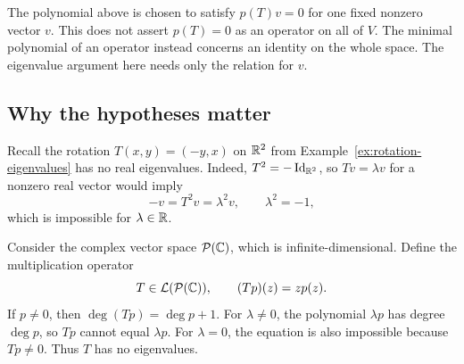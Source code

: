 \begin{remark}
  The polynomial above is chosen to satisfy $p(T)v=0$ for one fixed
  nonzero vector $v$. This does not assert $p(T)=0$ as an operator
  on all of $V$. The minimal polynomial of an operator instead
  concerns an identity on the whole space. The eigenvalue argument
  here needs only the relation for $v$.
\end{remark}

\subsection{Why the hypotheses matter}

\begin{example}
  Recall the rotation $T(x,y)=(-y,x)$ on $\mathbb{R}^2$ from
  Example~\ref{ex:rotation-eigenvalues} has no real eigenvalues.
  Indeed, $T^2=-\operatorname{Id}_{\mathbb{R}^2}$, so $Tv=\lambda v$
  for a nonzero real vector would imply
  \[
    -v=T^2v=\lambda^2v,\qquad\lambda^2=-1,
  \]
  which is impossible for $\lambda\in\mathbb{R}$.
\end{example}

\begin{example}
  Consider the complex vector space $\mathcal P(\mathbb{C})$, which
  is infinite-dimensional. Define the multiplication operator
  \[
    T\in\mathcal L(\mathcal P(\mathbb{C})),\qquad (Tp)(z)=zp(z).
  \]
  If $p\neq0$, then $\deg(Tp)=\deg p+1$. For $\lambda\neq0$,
  the polynomial $\lambda p$ has degree $\deg p$, so $Tp$ cannot
  equal $\lambda p$. For $\lambda=0$, the equation is also
  impossible because $Tp\neq0$. Thus $T$ has no eigenvalues.
\end{example}
